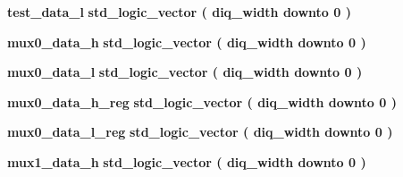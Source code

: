 \begin{DoxyCompactItemize}
\item 
{\bf test\+\_\+data\+\_\+l} {\bfseries \textcolor{comment}{std\+\_\+logic\+\_\+vector}\textcolor{vhdlchar}{ }\textcolor{vhdlchar}{(}\textcolor{vhdlchar}{ }\textcolor{vhdlchar}{ }\textcolor{vhdlchar}{ }\textcolor{vhdlchar}{ }{\bfseries {\bf diq\+\_\+width}} \textcolor{vhdlchar}{ }\textcolor{keywordflow}{downto}\textcolor{vhdlchar}{ }\textcolor{vhdlchar}{ } \textcolor{vhdldigit}{0} \textcolor{vhdlchar}{ }\textcolor{vhdlchar}{)}\textcolor{vhdlchar}{ }} 
\item 
{\bf mux0\+\_\+data\+\_\+h} {\bfseries \textcolor{comment}{std\+\_\+logic\+\_\+vector}\textcolor{vhdlchar}{ }\textcolor{vhdlchar}{(}\textcolor{vhdlchar}{ }\textcolor{vhdlchar}{ }\textcolor{vhdlchar}{ }\textcolor{vhdlchar}{ }{\bfseries {\bf diq\+\_\+width}} \textcolor{vhdlchar}{ }\textcolor{keywordflow}{downto}\textcolor{vhdlchar}{ }\textcolor{vhdlchar}{ } \textcolor{vhdldigit}{0} \textcolor{vhdlchar}{ }\textcolor{vhdlchar}{)}\textcolor{vhdlchar}{ }} 
\item 
{\bf mux0\+\_\+data\+\_\+l} {\bfseries \textcolor{comment}{std\+\_\+logic\+\_\+vector}\textcolor{vhdlchar}{ }\textcolor{vhdlchar}{(}\textcolor{vhdlchar}{ }\textcolor{vhdlchar}{ }\textcolor{vhdlchar}{ }\textcolor{vhdlchar}{ }{\bfseries {\bf diq\+\_\+width}} \textcolor{vhdlchar}{ }\textcolor{keywordflow}{downto}\textcolor{vhdlchar}{ }\textcolor{vhdlchar}{ } \textcolor{vhdldigit}{0} \textcolor{vhdlchar}{ }\textcolor{vhdlchar}{)}\textcolor{vhdlchar}{ }} 
\item 
{\bf mux0\+\_\+data\+\_\+h\+\_\+reg} {\bfseries \textcolor{comment}{std\+\_\+logic\+\_\+vector}\textcolor{vhdlchar}{ }\textcolor{vhdlchar}{(}\textcolor{vhdlchar}{ }\textcolor{vhdlchar}{ }\textcolor{vhdlchar}{ }\textcolor{vhdlchar}{ }{\bfseries {\bf diq\+\_\+width}} \textcolor{vhdlchar}{ }\textcolor{keywordflow}{downto}\textcolor{vhdlchar}{ }\textcolor{vhdlchar}{ } \textcolor{vhdldigit}{0} \textcolor{vhdlchar}{ }\textcolor{vhdlchar}{)}\textcolor{vhdlchar}{ }} 
\item 
{\bf mux0\+\_\+data\+\_\+l\+\_\+reg} {\bfseries \textcolor{comment}{std\+\_\+logic\+\_\+vector}\textcolor{vhdlchar}{ }\textcolor{vhdlchar}{(}\textcolor{vhdlchar}{ }\textcolor{vhdlchar}{ }\textcolor{vhdlchar}{ }\textcolor{vhdlchar}{ }{\bfseries {\bf diq\+\_\+width}} \textcolor{vhdlchar}{ }\textcolor{keywordflow}{downto}\textcolor{vhdlchar}{ }\textcolor{vhdlchar}{ } \textcolor{vhdldigit}{0} \textcolor{vhdlchar}{ }\textcolor{vhdlchar}{)}\textcolor{vhdlchar}{ }} 
\item 
{\bf mux1\+\_\+data\+\_\+h} {\bfseries \textcolor{comment}{std\+\_\+logic\+\_\+vector}\textcolor{vhdlchar}{ }\textcolor{vhdlchar}{(}\textcolor{vhdlchar}{ }\textcolor{vhdlchar}{ }\textcolor{vhdlchar}{ }\textcolor{vhdlchar}{ }{\bfseries {\bf diq\+\_\+width}} \textcolor{vhdlchar}{ }\textcolor{keywordflow}{downto}\textcolor{vhdlchar}{ }\textcolor{vhdlchar}{ } \textcolor{vhdldigit}{0} \textcolor{vhdlchar}{ }\textcolor{vhdlchar}{)}\textcolor{vhdlchar}{ }} 

\end{DoxyCompactItemize}
